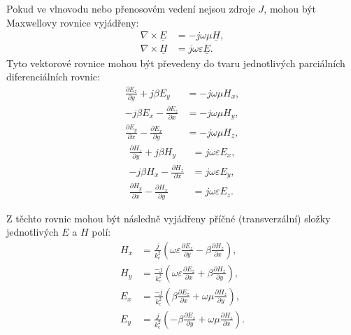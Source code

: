 \documentclass[12pt,a4paper,oneside]{article}
\numberwithin{equation}{section} %
\numberwithin{figure}{section} %
\numberwithin{table}{section} %
\newcommand{\faz}[1]{{\underline{#1}}} %
\begin{document}
Pokud ve vlnovodu nebo přenosovém vedení nejsou zdroje $J$, mohou být Maxwellovy rovnice vyjádřeny:
\begin{subequations}
\label{maxvektor2}
\begin{align}
\nabla \times \faz{E} &= -j\omega \mu \faz{H} ,
\\
\nabla \times \faz{H} &= j\omega \varepsilon \faz{E} .
\end{align}
\end{subequations}
Tyto vektorové rovnice mohou být převedeny do tvaru jednotlivých parciálních diferenciálních rovnic:
\begin{subequations}
\begin{align}
\frac{\partial E_z}{\partial y} + j \beta E_y &= -j \omega \mu H_x ,
\label{maxpart1}
\\
-j \beta E_x - \frac{\partial E_z}{\partial x} &= - j \omega \mu H_y ,
\\
\frac{\partial E_y}{\partial x} - \frac{\partial E_x}{\partial y} &= -j \omega \mu H_z ,
\end{align}
\end{subequations}
\begin{subequations}
\begin{align}
\frac{\partial H_z}{\partial y} + j \beta H_y &= j \omega \varepsilon E_x ,
\label{maxpart4}
\\
-j \beta H_x - \frac{\partial H_z}{\partial x} &= j \omega \varepsilon E_y ,
\label{maxpart5}
\\
\frac{\partial H_y}{\partial x} - \frac{\partial H_x}{\partial y} &= j \omega \varepsilon E_z .
\end{align}
\end{subequations}

Z těchto rovnic mohou být následně vyjádřeny příčné (transverzální) složky jednotlivých $E$ a $H$ polí:
\begin{subequations}
\label{vyjadreno}
\begin{align}
H_x &= \frac{j}{k^2_c} \left( \omega \varepsilon \frac{\partial E_z}{\partial y} - \beta \frac{\partial H_z}{\partial x} \right) ,
\\
H_y &= \frac{-j}{k^2_c} \left( \omega \varepsilon \frac{\partial E_z}{\partial x} + \beta \frac{\partial H_z}{\partial y} \right) ,
\\
E_x &= \frac{-j}{k^2_c} \left( \beta \frac{\partial E_z}{\partial x} + \omega \mu \frac{\partial H_z}{\partial y} \right) ,
\\
E_y &= \frac{j}{k^2_c} \left(- \beta \frac{\partial E_z}{\partial y} + \omega \mu \frac{\partial H_z}{\partial x} \right) .
\end{align}
\end{subequations}
\end{document}
